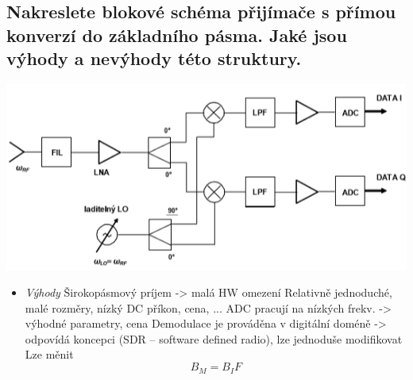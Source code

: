 \documentclass[a4paper,czech]{article}
\begin{document}
\subsection{\textbf{Nakreslete blokové schéma přijímače s přímou konverzí do základního pásma. Jaké jsou výhody a nevýhody této struktury.}}
\includegraphics{images/tx_priama_konv.png}
\begin{itemize}
	\item\textit{Výhody}
		\subitem Širokopásmový príjem -> malá HW omezení
		\subitem Relativně jednoduché, malé rozměry, nízký DC příkon, cena, ...
		\subitem ADC pracují na nízkých frekv. -> výhodné parametry, cena
		\subitem Demodulace je prováděna v digitální doméně -> odpovídá koncepci (SDR – software defined radio), lze jednoduše modifikovat
		\subitem Lze měnit $$B_M=B_IF$$
\end{itemize}
\end{document}
